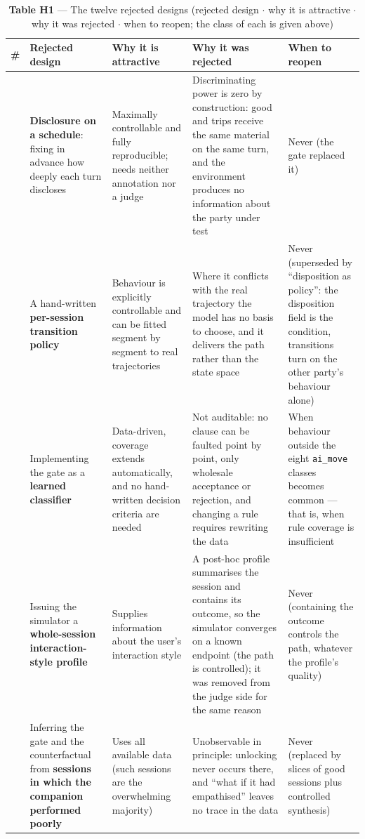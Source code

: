 \documentclass[letterpaper]{article}
\begin{document}
\begin{table}[t]
\centering\footnotesize
\setlength{\tabcolsep}{4pt}
\caption{\textbf{Table H1} --- The twelve rejected designs (rejected design $\cdot$ why it is attractive $\cdot$ why it was rejected $\cdot$ when to reopen; the class of each is given above)}
\begin{tabular}{@{}>{\raggedright\arraybackslash}p{}>{\raggedright\arraybackslash}p{}>{\raggedright\arraybackslash}p{}>{\raggedright\arraybackslash}p{}>{\raggedright\arraybackslash}p{}@{}}
\toprule
\# & Rejected design & Why it is attractive & Why it was rejected & When to reopen \\
\midrule
1 & \textbf{Disclosure on a schedule}: fixing in advance how deeply each turn discloses & Maximally controllable and fully reproducible; needs neither annotation nor a judge & Discriminating power is zero by construction: good and trips receive the same material on the same turn, and the environment produces no information about the party under test & Never (the gate replaced it) \\
2 & A hand-written \textbf{per-session transition policy} & Behaviour is explicitly controllable and can be fitted segment by segment to real trajectories & Where it conflicts with the real trajectory the model has no basis to choose, and it delivers the path rather than the state space & Never (superseded by ``disposition as policy'': the disposition field is the condition, transitions turn on the other party's behaviour alone) \\
3 & Implementing the gate as a \textbf{learned classifier} & Data-driven, coverage extends automatically, and no hand-written decision criteria are needed & Not auditable: no clause can be faulted point by point, only wholesale acceptance or rejection, and changing a rule requires rewriting the data & When behaviour outside the eight \texttt{ai\_move} classes becomes common --- that is, when rule coverage is insufficient \\
4 & Issuing the simulator a \textbf{whole-session interaction-style profile} & Supplies information about the user's interaction style & A post-hoc profile summarises the session and contains its outcome, so the simulator converges on a known endpoint (the path is controlled); it was removed from the judge side for the same reason & Never (containing the outcome controls the path, whatever the profile's quality) \\
5 & Inferring the gate and the counterfactual from \textbf{sessions in which the companion performed poorly} & Uses all available data (such sessions are the overwhelming majority) & Unobservable in principle: unlocking never occurs there, and ``what if it had empathised'' leaves no trace in the data & Never (replaced by slices of good sessions plus controlled synthesis) \\

\end{tabular}
\end{table}
\end{document}

